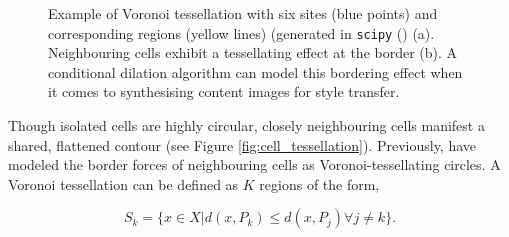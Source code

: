 \begin{figure}%
    \centering
    \qquad
    \qquad
    \caption{Example of Voronoi tessellation with six sites (blue points) and corresponding regions (yellow lines) (generated in \texttt{scipy} (\cite{2020SciPy-NMeth}) (a). Neighbouring cells exhibit a tessellating effect at the border (b). A conditional dilation algorithm can model this bordering effect when it comes to synthesising content images for style transfer.}%
    \label{fig:conditional_dilation}%
\end{figure}

Though isolated cells are highly circular, closely neighbouring cells manifest a shared, flattened contour (see Figure \ref{fig:cell_tessellation}). Previously, \cite{bock2010generalized} have modeled the border forces of neighbouring cells as Voronoi-tessellating circles. A Voronoi tessellation can be defined as $K$ regions of the form,

\begin{equation}
S_k = \Big\{x \in X | d(x, P_k) \leq d(x, P_j) \forall j \neq k \Big\}.
\label{eq:voronoi}
\end{equation}

